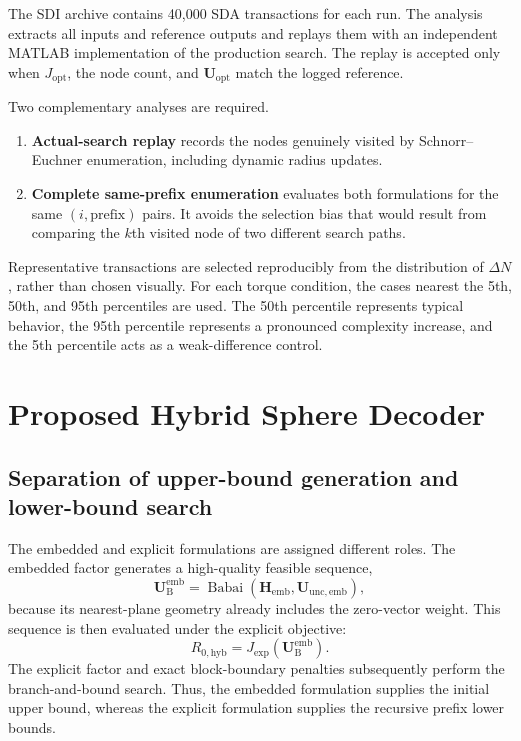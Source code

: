 \documentclass[paper=a4,oneside,fontsize=12pt,DIV=14,headings=normal,parskip=half,headsepline,numbers=noendperiod]{scrreprt}
\newcommand{\vct}[1]{\bm{#1}}
\newcommand{\mat}[1]{\bm{#1}}
\begin{document}
The SDI archive contains 40,000 SDA transactions for each run.  The analysis
extracts all inputs and reference outputs and replays them with an independent
MATLAB implementation of the production search.  The replay is accepted only
when $J_{\mathrm{opt}}$, the node count, and $\vct U_{\mathrm{opt}}$ match the
logged reference.

Two complementary analyses are required.
\begin{enumerate}
 \item \textbf{Actual-search replay} records the nodes genuinely visited by
 Schnorr--Euchner enumeration, including dynamic radius updates.
 \item \textbf{Complete same-prefix enumeration} evaluates both formulations
 for the same $(i,\text{prefix})$ pairs.  It avoids the selection bias that
 would result from comparing the $k$th visited node of two different search
 paths.
\end{enumerate}

Representative transactions are selected reproducibly from the distribution
of $\Delta N$, rather than chosen visually.  For each torque condition, the
cases nearest the 5th, 50th, and 95th percentiles are used.  The 50th percentile
represents typical behavior, the 95th percentile represents a pronounced
complexity increase, and the 5th percentile acts as a weak-difference control.

\chapter{Proposed Hybrid Sphere Decoder}

\section{Separation of upper-bound generation and lower-bound search}
The embedded and explicit formulations are assigned different roles.  The
embedded factor generates a high-quality feasible sequence,
\begin{equation}
 \vct U_{\mathrm B}^{\mathrm{emb}}
 =\operatorname{Babai}(\mat H_{\mathrm{emb}},
                       \vct U_{\mathrm{unc,emb}}),
\end{equation}
because its nearest-plane geometry already includes the zero-vector weight.
This sequence is then evaluated under the explicit objective:
\begin{equation}
 R_{0,\mathrm{hyb}}
 =J_{\mathrm{exp}}(\vct U_{\mathrm B}^{\mathrm{emb}}).
 \label{eq:hybrid_radius}
\end{equation}
The explicit factor and exact block-boundary penalties subsequently perform
the branch-and-bound search.  Thus, the embedded formulation supplies the
initial upper bound, whereas the explicit formulation supplies the recursive
prefix lower bounds.
\end{document}
